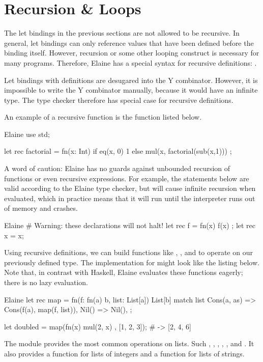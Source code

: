\section{Recursion \& Loops}\label{sec:recursion}

The let bindings in the previous sections are not allowed to be recursive. In general, let bindings can only reference values that have been defined before the binding itself. However, recursion or some other looping construct is necessary for many programs. Therefore, Elaine has a special syntax for recursive definitions: .

Let bindings with  definitions are desugared into the Y combinator. However, it is impossible to write the Y combinator manually, because it would have an infinite type. The type checker therefore has special case for recursive definitions.

An example of a recursive function is the  function listed below.

\begin{lst}{Elaine}
use std;

let rec factorial = fn(x: Int) {
    if eq(x, 0) {
        1
    } else {
        mul(x, factorial(sub(x,1)))
    }
};
\end{lst}
%
A word of caution: Elaine has no guards against unbounded recursion of functions or even recursive expressions. For example, the statements below are valid according to the Elaine type checker, but will cause infinite recursion when evaluated, which in practice means that it will run until the interpreter runs out of memory and crashes.

\begin{lst}{Elaine}
# Warning: these declarations will not halt!
let rec f = fn(x) { f(x) };
let rec x = x;
\end{lst}
%
Using recursive definitions, we can build functions like , , and  to operate on our previously defined  type. The implementation for  might look like the listing below. Note that, in contrast with Haskell, Elaine evaluates these functions eagerly; there is no lazy evaluation.

\begin{lst}{Elaine}
let rec map = fn(f: fn(a) b, list: List[a]) List[b] {
    match list {
        Cons(a, as) => Cons(f(a), map(f, list)),
        Nil() => Nil(),
    }
};

let doubled = map(fn(x) { mul(2, x) }, [1, 2, 3]); # -> [2, 4, 6]
\end{lst}
%
The  module provides the most common operations on lists. Such , , , , , and . It also provides a  function for lists of integers and a  function for lists of strings.

